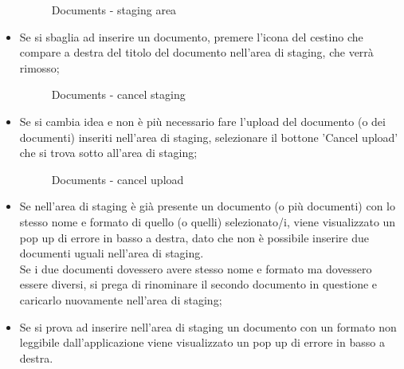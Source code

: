 \documentclass[10pt, a4paper]{article}
\begin{document}
\begin{itemize}
\begin{figure}[H]
        \caption{Documents - staging area}
        \label{img:docsStageArea}
    \end{figure}
    \item Se si sbaglia ad inserire un documento, premere l'icona del cestino che compare a destra del titolo del documento nell'area di staging, che verrà rimosso;
    \begin{figure}[H]
        \centering  
        \caption{Documents - cancel staging}
        \label{img:docsStageAreadel}
    \end{figure}
    \item Se si cambia idea e non è più necessario fare l'upload del documento (o dei documenti) inseriti nell'area di staging, selezionare il bottone 'Cancel upload' che si trova sotto all'area di staging;
    \begin{figure}[H]
        \centering  
        \caption{Documents - cancel upload}
        \label{img:docsStageAreacancel}
    \end{figure}
    \item Se nell'area di staging è già presente un documento (o più documenti) con lo stesso nome e formato di quello (o quelli) selezionato/i, viene visualizzato un pop up di errore in basso a destra, dato che non è possibile inserire due documenti uguali nell'area di staging.\\ Se i due documenti dovessero avere stesso nome e formato ma dovessero essere diversi, si prega di rinominare il secondo documento in questione e caricarlo nuovamente nell'area di staging;
    
    \item Se si prova ad inserire nell'area di staging un documento con un formato non leggibile dall'applicazione viene visualizzato un pop up di errore in basso a destra.
    \end{itemize} 
\end{document}
